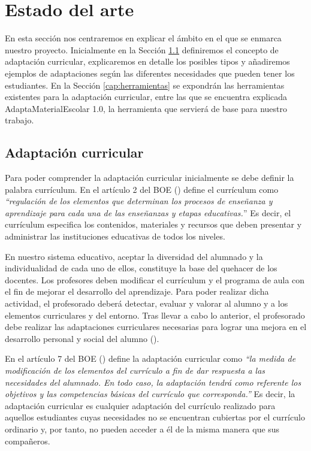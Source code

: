 \chapter{Estado del arte}
\label{cap:estadoDelArte}
En esta sección nos centraremos en explicar el ámbito en el que se enmarca nuestro proyecto. Inicialmente en la Sección \ref{cap:adaptacion} definiremos el concepto de adaptación curricular, explicaremos en detalle los posibles tipos y añadiremos ejemplos de adaptaciones según las diferentes necesidades que pueden tener los estudiantes. En la Sección \ref{cap:herramientas}  se expondrán las herramientas existentes para la adaptación curricular, entre las que se encuentra explicada AdaptaMaterialEscolar 1.0, la herramienta que servierá de base para nuestro trabajo.

\section{Adaptación curricular}\label{cap:adaptacion}
Para poder comprender la adaptación curricular inicialmente se debe definir la palabra currículum. En el artículo 2 del BOE (\citeyear[p.5]{BOE2}) define el currículum como \textit{``regulación de los elementos que determinan los procesos de enseñanza y aprendizaje para cada una de las enseñanzas y etapas educativas.}'' Es decir, el currículum especifica los contenidos, materiales y recursos que deben presentar y administrar las instituciones educativas de todos los niveles.
\newline

En nuestro sistema educativo, aceptar la diversidad del alumnado y la individualidad de cada uno de ellos, constituye la base del quehacer de los docentes. Los profesores deben modificar el currículum y el programa de aula con el fin de mejorar el desarrollo del aprendizaje. Para poder realizar dicha actividad, el profesorado deberá detectar, evaluar y valorar al alumno y a los elementos curriculares y del entorno. Tras llevar a cabo lo anterior, el profesorado debe realizar las adaptaciones curriculares necesarias para lograr una mejora en el desarrollo personal y social del alumno (\cite{adaptacionIntro}).
\newline

En el artículo 7 del BOE (\citeyear[p.7]{BOE}) define la adaptación curricular como \textit{``la medida de modificación de los elementos del currículo a fin de dar respuesta a las necesidades del alumnado. En todo caso, la adaptación tendrá como referente los objetivos y las competencias básicas del currículo que corresponda.''} Es decir, la adaptación curricular es cualquier adaptación del currículo realizado para aquellos estudiantes cuyas necesidades no se encuentran cubiertas por el currículo ordinario y, por tanto, no pueden acceder a él de la misma manera que sus compañeros.
\newline

